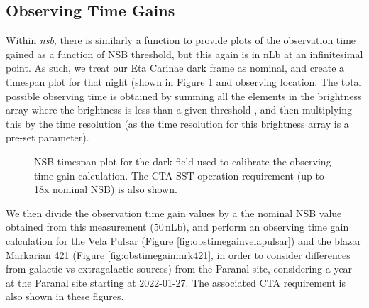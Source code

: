 \subsection{Observing Time Gains}
Within \textit{nsb}, there is similarly a function to provide plots of the observation time gained as a function of NSB threshold, but this again is in nLb at an infinitesimal point. As such, we treat our Eta Carinae dark frame as nominal, and create a timespan plot for that night (shown in Figure \ref{fig:timespan_dark} and observing location. The total possible observing time is obtained by summing all the elements in the brightness array where the brightness is less than a given threshold , and then multiplying this by the time resolution (as the time resolution for this brightness array is a pre-set parameter).
\begin{figure}[ht]
\begin{centering}
\caption{NSB timespan plot for the dark field used to calibrate the observing time gain calculation. The CTA SST operation requirement (up to 18x nominal NSB) is also shown.}
\label{fig:timespan_dark}
\end{centering}
\end{figure}

We then divide the observation time gain values by a the nominal NSB value obtained from this measurement ($\mathrm{50\,nLb}$), and perform an observing time gain calculation for the Vela Pulsar (Figure \ref{fig:obstimegainvelapulsar}) and the blazar Markarian 421 (Figure \ref{fig:obstimegainmrk421}, in order to consider differences from galactic vs extragalactic sources) from the Paranal site, considering a year at the Paranal site starting at 2022-01-27. The associated CTA requirement is also shown in these figures.

